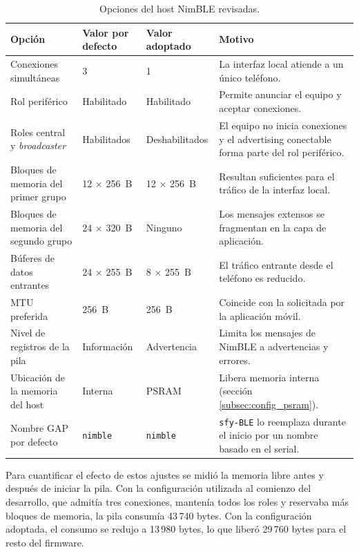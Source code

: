 \begin{table}[htbp]
\centering
\caption{Opciones del host NimBLE revisadas.}
\label{tab:config_nimble}
\small
\setlength{\tabcolsep}{4pt}
\begin{tabular}{L{0.24\textwidth} L{0.15\textwidth} L{0.17\textwidth} L{0.32\textwidth}}
\toprule
\textbf{Opción} & \textbf{Valor por defecto} & \textbf{Valor adoptado} & \textbf{Motivo} \\
\midrule
Conexiones simultáneas & 3 & 1 & La interfaz local atiende a un único teléfono. \\
Rol periférico & Habilitado & Habilitado & Permite anunciar el equipo y aceptar conexiones. \\
Roles central y \textit{broadcaster} & Habilitados & Deshabilitados & El equipo no inicia conexiones y el advertising conectable forma parte del rol periférico. \\
Bloques de memoria del primer grupo & 12 $\times$ 256~B & 12 $\times$ 256~B & Resultan suficientes para el tráfico de la interfaz local. \\
Bloques de memoria del segundo grupo & 24 $\times$ 320~B & Ninguno & Los mensajes extensos se fragmentan en la capa de aplicación. \\
Búferes de datos entrantes & 24 $\times$ 255~B & 8 $\times$ 255~B & El tráfico entrante desde el teléfono es reducido. \\
MTU preferida & 256~B & 256~B & Coincide con la solicitada por la aplicación móvil. \\
Nivel de registros de la pila & Información & Advertencia & Limita los mensajes de NimBLE a advertencias y errores. \\
Ubicación de la memoria del host & Interna & PSRAM & Libera memoria interna (sección \ref{subsec:config_psram}). \\
Nombre GAP por defecto & \texttt{nimble} & \texttt{nimble} & \texttt{sfy-BLE} lo reemplaza durante el inicio por un nombre basado en el serial. \\
\bottomrule
\end{tabular}
\end{table}

Para cuantificar el efecto de estos ajustes se midió la memoria libre antes y después de iniciar la pila. Con la configuración utilizada al comienzo del desarrollo, que admitía tres conexiones, mantenía todos los roles y reservaba más bloques de memoria, la pila consumía 43\,740 bytes. Con la configuración adoptada, el consumo se redujo a 13\,980 bytes, lo que liberó 29\,760 bytes para el resto del firmware.

